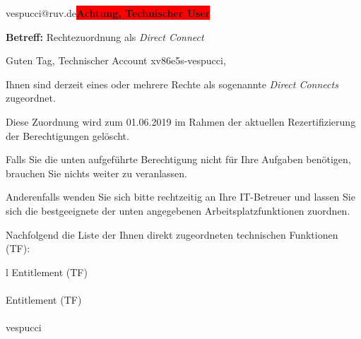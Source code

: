 \documentclass[a4paper,landscape,12pt]{letter}
\begin{document}
\begin{letter}{vespucci@ruv.de\space\space\space\space\space\space\space\space\space\bfseries\colorbox{red}{Achtung, Technischer User}\hfill \break}
\begin{normalsize}
	\opening{\textbf{Betreff:} Rechtezuordnung als \emph{Direct Connect}}
	\begin{normalsize} \hfill
	\end{normalsize}

	\begin{normalsize}
		Guten Tag, 
	Technischer Account xv86e5s-vespucci, \hfill \break
	\end{normalsize}
	\end{normalsize}
	
\begin{normalsize}
	Ihnen sind derzeit eines oder mehrere Rechte als sogenannte \emph{Direct Connects} zugeordnet.
	
	Diese Zuordnung wird zum 01.06.2019 im Rahmen der aktuellen Rezertifizierung der Berechtigungen gelöscht.
	
	Falls Sie die unten aufgeführte Berechtigung nicht für Ihre Aufgaben benötigen, 
	brauchen Sie nichts weiter zu veranlassen.
	
	Anderenfalls wenden Sie sich bitte rechtzeitig an Ihre IT-Betreuer 
	und lassen Sie sich die bestgeeignete der unten angegebenen Arbeitsplatzfunktionen zuordnen.
	\end{normalsize}
	
\begin{normalsize}
	Nachfolgend die Liste der Ihnen direkt zugeordneten technischen Funktionen (TF):

	\begin{longtable}{l}
		Entitlement (TF) \\ \hline
		\endfirsthead
		\\\hline
		Entitlement (TF) \\ \hline
		\endhead %
		\multicolumn{1}{r@{}}{Fortsetzung \ldots}\\
		\endfoot
		\hline
		\endlastfoot
	vespucci\\
	\end{longtable}
	\end{normalsize}
	

\end{letter}
\end{document}
